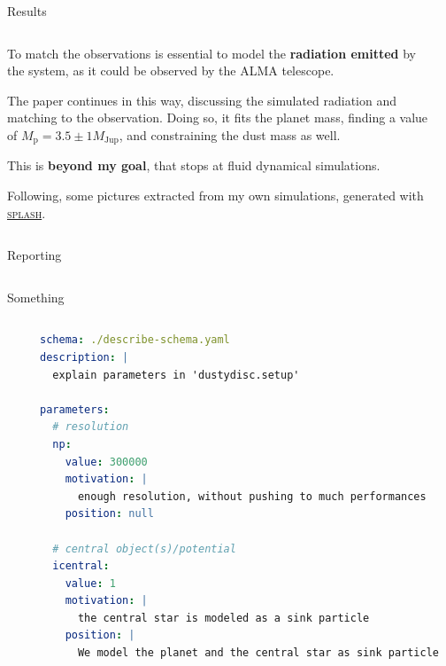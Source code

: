 \documentclass[9pt]{beamer}
\newcommand{\splash}{\textsc{splash}\xspace}
\begin{document}
\begin{frame}{Results}
    \begin{columns}
        \begin{column}{0.5\textwidth}
            To match the observations is essential to model the
            \textbf{radiation emitted} by the system, as it could be observed
            by the ALMA telescope.

            The paper continues in this way, discussing the simulated radiation
            and matching to the observation.
            Doing so, it fits the planet mass, finding a value of $M_\text{p} =
            3.5 \pm 1 M_\text{Jup}$, and constraining the dust mass as well.
            \vspace*{10pt}

            This is \textbf{beyond my goal}, that stops at fluid dynamical
            simulations.

            Following, some pictures extracted from my own simulations,
            generated with
            \href{https://users.monash.edu.au/~dprice/splash/}{\splash}.
        \end{column}
        \begin{column}{0.5\textwidth}
        \end{column}
    \end{columns}
\end{frame}

\begin{frame}{Reporting}
    \begin{columns}
        \begin{column}{0.5\textwidth}
        \end{column}
        \begin{column}{0.5\textwidth}
        \end{column}
    \end{columns}
\end{frame}

\begin{frame}[fragile]{Something}
    \begin{columns}
        \begin{column}{0.5\textwidth}
        \end{column}
        \begin{column}{0.5\textwidth}
            \begin{lstlisting}[style=mystyle, language=yaml, breaklines=true]
schema: ./describe-schema.yaml
description: |
  explain parameters in 'dustydisc.setup'

parameters:
  # resolution
  np:
    value: 300000
    motivation: |
      enough resolution, without pushing to much performances
    position: null

  # central object(s)/potential
  icentral:
    value: 1
    motivation: |
      the central star is modeled as a sink particle
    position: |
      We model the planet and the central star as sink particle
\end{lstlisting}
        \end{column}
    \end{columns}
\end{frame}
\end{document}
